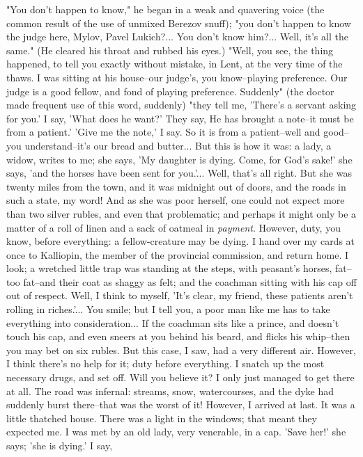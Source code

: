 "You don't happen to know," he began in a weak and quavering voice
(the common result of the use of unmixed Berezov snuff); "you don't
happen to know the judge here, Mylov, Pavel Lukich?... You don't know
him?... Well, it's all the same." (He cleared his throat and rubbed
his eyes.) "Well, you see, the thing happened, to tell you exactly
without mistake, in Lent, at the very time of the thaws. I was sitting
at his house--our judge's, you know--playing preference. Our judge is
a good fellow, and fond of playing preference. Suddenly" (the doctor
made frequent use of this word, suddenly) "they tell me, 'There's a
servant asking for you.' I say, 'What does he want?' They say, He has
brought a note--it must be from a patient.' 'Give me the note,' I say.
So it is from a patient--well and good--you understand--it's our bread
and butter... But this is how it was: a lady, a widow, writes to me;
she says, 'My daughter is dying. Come, for God's sake!' she says, 'and
the horses have been sent for you.'... Well, that's all right. But she
was twenty miles from the town, and it was midnight out of doors, and
the roads in such a state, my word! And as she was poor herself, one
could not expect more than two silver rubles, and even that
problematic; and perhaps it might only be a matter of a roll of linen
and a sack of oatmeal in \emph{payment}. However, duty, you know, before
everything: a fellow-creature may be dying. I hand over my cards at
once to Kalliopin, the member of the provincial commission, and return
home. I look; a wretched little trap was standing at the steps, with
peasant's horses, fat--too fat--and their coat as shaggy as felt; and
the coachman sitting with his cap off out of respect. Well, I think to
myself, 'It's clear, my friend, these patients aren't rolling in
riches.'... You smile; but I tell you, a poor man like me has to take
everything into consideration... If the coachman sits like a prince,
and doesn't touch his cap, and even sneers at you behind his beard,
and flicks his whip--then you may bet on six rubles. But this case, I
saw, had a very different air. However, I think there's no help for
it; duty before everything. I snatch up the most necessary drugs, and
set off. Will you believe it? I only just managed to get there at all.
The road was infernal: streams, snow, watercourses, and the dyke had
suddenly burst there--that was the worst of it! However, I arrived at
last. It was a little thatched house. There was a light in the
windows; that meant they expected me. I was met by an old lady, very
venerable, in a cap. 'Save her!' she says; 'she is dying.' I say,

